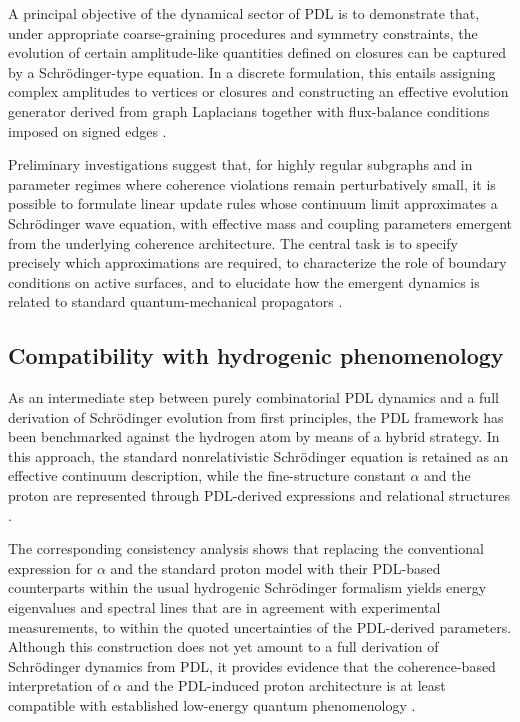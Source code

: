 \documentclass{article}
\begin{document}
A principal objective of the dynamical sector of PDL is to demonstrate that, under appropriate coarse-graining procedures and symmetry constraints, the evolution of certain amplitude-like quantities defined on closures can be captured by a Schr\"odinger-type equation. In a discrete formulation, this entails assigning complex amplitudes to vertices or closures and constructing an effective evolution generator derived from graph Laplacians together with flux-balance conditions imposed on signed edges \cite{Coherence_Leakage_18_2026,Coherence_Leakage_18_2026}.

Preliminary investigations suggest that, for highly regular subgraphs and in parameter regimes where coherence violations remain perturbatively small, it is possible to formulate linear update rules whose continuum limit approximates a Schr\"odinger wave equation, with effective mass and coupling parameters emergent from the underlying coherence architecture. The central task is to specify precisely which approximations are required, to characterize the role of boundary conditions on active surfaces, and to elucidate how the emergent dynamics is related to standard quantum-mechanical propagators \cite{Coherence_Leakage_18_2026,PDL_position}.

\subsection{Compatibility with hydrogenic phenomenology}
\label{subsec:hydrogen_compatibility}

As an intermediate step between purely combinatorial PDL dynamics and a full derivation of Schrödinger evolution from first principles, the PDL framework has been benchmarked against the hydrogen atom by means of a hybrid strategy. In this approach, the standard nonrelativistic Schrödinger equation is retained as an effective continuum description, while the fine-structure constant \(\alpha\) and the proton are represented through PDL-derived expressions and relational structures \cite{Schrodinger_Sketch_v2_2026}.

The corresponding consistency analysis shows that replacing the conventional expression for \(\alpha\) and the standard proton model with their PDL-based counterparts within the usual hydrogenic Schrödinger formalism yields energy eigenvalues and spectral lines that are in agreement with experimental measurements, to within the quoted uncertainties of the PDL-derived parameters. Although this construction does not yet amount to a full derivation of Schrödinger dynamics from PDL, it provides evidence that the coherence-based interpretation of \(\alpha\) and the PDL-induced proton architecture is at least compatible with established low-energy quantum phenomenology \cite{Schrodinger_Sketch_v2_2026,PDL_position}.
\end{document}

